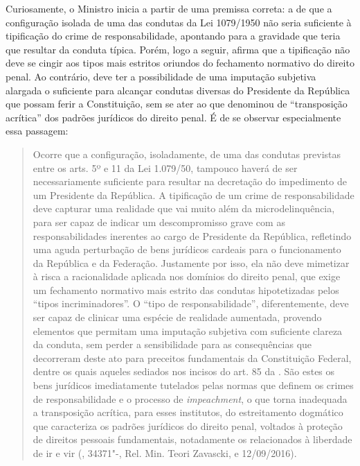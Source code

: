 Curiosamente, o Ministro inicia a partir de uma premissa correta: a de
que a configuração isolada de uma das condutas da Lei 1079/1950 não
seria suficiente à tipificação do crime de responsabilidade, apontando
para a gravidade que teria que resultar da conduta típica. Porém, logo a
seguir, afirma que a tipificação não deve se cingir aos tipos mais
estritos oriundos do fechamento normativo do direito penal. Ao
contrário, deve ter a possibilidade de uma imputação subjetiva alargada
o suficiente para alcançar condutas diversas do Presidente da República
que possam ferir a Constituição, sem se ater ao que denominou de
``transposição acrítica'' dos padrões jurídicos do direito penal. É de
se observar especialmente essa passagem:

\begin{quote}
Ocorre que a configuração, isoladamente, de uma das condutas previstas
entre os arts. 5º e 11 da Lei 1.079/50, tampouco haverá de ser
necessariamente suficiente para resultar na decretação do impedimento de
um Presidente da República. A tipificação de um crime de
responsabilidade deve capturar uma realidade que vai muito além da
microdelinquência, para ser capaz de indicar um descompromisso grave com
as responsabilidades inerentes ao cargo de Presidente da República,
refletindo uma aguda perturbação de bens jurídicos cardeais para o
funcionamento da República e da Federação. Justamente por isso, ela não
deve mimetizar à risca a racionalidade aplicada nos domínios do direito
penal, que exige um fechamento normativo mais estrito das condutas
hipotetizadas pelos ``tipos incriminadores''. O ``tipo de
responsabilidade'', diferentemente, deve ser capaz de clinicar uma
espécie de realidade aumentada, provendo elementos que permitam uma
imputação subjetiva com suficiente clareza da conduta, sem perder a
sensibilidade para as consequências que decorreram deste ato para
preceitos fundamentais da Constituição Federal, dentre os quais aqueles
sediados nos incisos do art. 85 da . São estes os bens jurídicos
imediatamente tutelados pelas normas que definem os crimes de
responsabilidade e o processo de \emph{impeachment}, o que torna
inadequada a transposição acrítica, para esses institutos, do
estreitamento dogmático que caracteriza os padrões jurídicos do direito
penal, voltados à proteção de direitos pessoais fundamentais,
notadamente os relacionados à liberdade de ir e vir (,  34371"-,
Rel. Min. Teori Zavascki, e 12/09/2016).
\end{quote}

